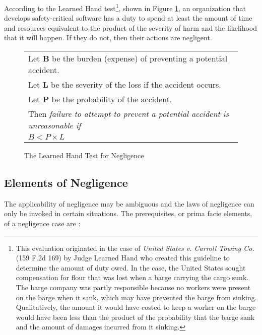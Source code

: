 According to the Learned Hand test\footnote{This evaluation originated in the
case of \textit{United States v. Carroll Towing Co.} (159 F.2d 169) by Judge
Learned Hand who created this guideline to determine the amount of duty owed.
In the case, the United States sought compensation for flour that was lost when
a barge carrying the cargo sunk. The barge company was partly responsible
because no workers were present on the barge when it sank, which may have
prevented the barge from sinking. Qualitatively, the amount it would have costed
to keep a worker on the barge would have been less than the product of the
probability that the barge sank and the amount of damages incurred from it
sinking.}, shown in Figure \ref{fig:handtest}, an organization that develops 
safety-critical software has a duty to spend at least the amount of time and
resources equivalent to the product of the severity of harm and the likelihood 
that it will happen. If they do not, then their actions are negligent.

\begin{figure}
\begin{narrow}{-1.5in}{-1.5in}\begin{center}
\begin{tabular}{|l|}
\hline
	Let \textbf{B} be the burden (expense) of preventing a potential accident.\\
	Let \textbf{L} be the severity of the loss if the accident occurs.\\
	Let \textbf{P} be the probability of the accident.\\[6pt]
	Then \textit{failure to attempt to prevent a potential accident is 
	unreasonable if}\\[8pt]

      \centerline{\(B < P \times L\)}
\\[3pt]
\hline
\end{tabular}
\end{center}\end{narrow}
\caption{The Learned Hand Test for Negligence}
\label{fig:handtest}
\end{figure}

\subsection{Elements of Negligence}\label{SS:Elements}
The applicability of negligence may be ambiguous and the laws of negligence can
only be invoked in certain situations. The prerequisites, or prima facie
elements, of a negligence case are \cite{Dobbs01}:

